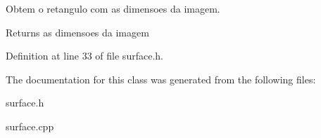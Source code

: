 Obtem o retangulo com as dimensoes da imagem. 

\begin{DoxyReturn}{Returns}
as dimensoes da imagem 
\end{DoxyReturn}


Definition at line 33 of file surface.\+h.



The documentation for this class was generated from the following files\+:\begin{DoxyCompactItemize}
\item 
surface.\+h\item 
surface.\+cpp\end{DoxyCompactItemize}
